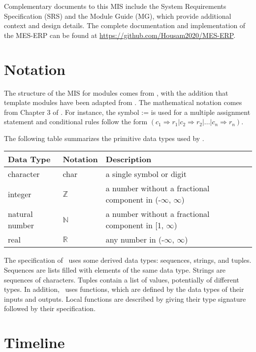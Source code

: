 \documentclass[12pt, titlepage]{article}
\begin{document}
Complementary documents to this MIS include the System Requirements Specification (SRS) and the Module Guide (MG), which provide additional context and design details. The complete documentation and implementation of the MES-ERP can be found at \url{https://github.com/Housam2020/MES-ERP}.


\section{Notation}

The structure of the MIS for modules comes from \citet{HoffmanAndStrooper1995},
with the addition that template modules have been adapted from
\cite{GhezziEtAl2003}.  The mathematical notation comes from Chapter 3 of
\citet{HoffmanAndStrooper1995}.  For instance, the symbol := is used for a
multiple assignment statement and conditional rules follow the form $(c_1
\Rightarrow r_1 | c_2 \Rightarrow r_2 | ... | c_n \Rightarrow r_n )$.

The following table summarizes the primitive data types used by \progname. 

\begin{center}
\renewcommand{\arraystretch}{1.2}
\noindent 
\begin{tabular}{l l p{7.5cm}} 
\toprule 
\textbf{Data Type} & \textbf{Notation} & \textbf{Description}\\ 
\midrule
character & char & a single symbol or digit\\
integer & $\mathbb{Z}$ & a number without a fractional component in (-$\infty$, $\infty$) \\
natural number & $\mathbb{N}$ & a number without a fractional component in [1, $\infty$) \\
real & $\mathbb{R}$ & any number in (-$\infty$, $\infty$)\\
\bottomrule
\end{tabular} 
\end{center}

\noindent
The specification of \progname \ uses some derived data types: sequences, strings, and
tuples. Sequences are lists filled with elements of the same data type. Strings
are sequences of characters. Tuples contain a list of values, potentially of
different types. In addition, \progname \ uses functions, which
are defined by the data types of their inputs and outputs. Local functions are
described by giving their type signature followed by their specification.

\section{Timeline}
\end{document}
